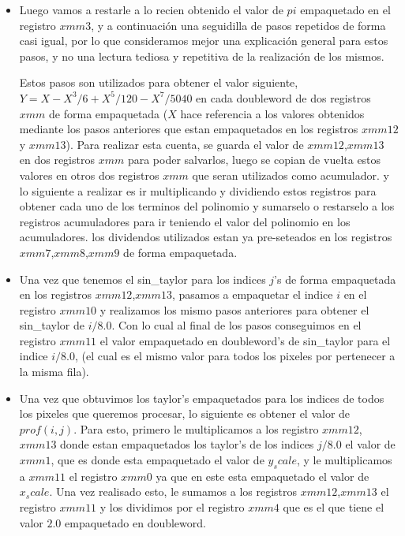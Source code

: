\begin{itemize}
	\item Luego vamos a restarle a lo recien obtenido el valor de $pi$ empaquetado en el registro $xmm3$, y a continuación una seguidilla de pasos repetidos de forma casi igual, por lo que consideramos mejor una explicación general para estos pasos, y no una lectura tediosa y repetitiva de la realización de los mismos.

	Estos pasos son utilizados para obtener el valor siguiente, $Y = X - X^3/6 + X^5/120 - X^7/5040$ en cada doubleword de dos registros $xmm$ de forma empaquetada ($X$ hace referencia a los valores obtenidos mediante los pasos anteriores que estan empaquetados en los registros $xmm12$ y $xmm13$).
	Para realizar esta cuenta, se guarda el valor de $xmm12$,$xmm13$ en dos registros $xmm$ para poder salvarlos, luego se copian de vuelta estos valores en otros dos registros $xmm$ que seran utilizados como acumulador. y lo siguiente a realizar es ir multiplicando y dividiendo estos registros para obtener cada uno de los terminos del polinomio y sumarselo o restarselo a los registros acumuladores para ir teniendo el valor del polinomio en los acumuladores. los dividendos utilizados estan ya pre-seteados en los registros $xmm7$,$xmm8$,$xmm9$ de forma empaquetada.

	\item Una vez que tenemos el sin_taylor para los indices $j$'s de forma empaquetada en los registros $xmm12$,$xmm13$, pasamos a empaquetar el indice $i$ en el registro $xmm10$ y realizamos los mismo pasos anteriores para obtener el sin_taylor de $i/8.0$. Con lo cual al final de los pasos conseguimos en el registro $xmm11$ el valor empaquetado en doubleword's de sin_taylor para el indice $i/8.0$, (el cual es el mismo valor para todos los pixeles por pertenecer a la misma fila).

	\item Una vez que obtuvimos los taylor's empaquetados para los indices de todos los pixeles que queremos procesar, lo siguiente es obtener el valor de $prof(i,j)$. Para esto, primero le multiplicamos a los registro $xmm12$,$xmm13$ donde estan empaquetados los taylor's de los indices $j/8.0$ el valor de $xmm1$, que es donde esta empaquetado el valor de $y_scale$, y le multiplicamos  a $xmm11$ el registro $xmm0$ ya que en este esta empaquetado el valor de $x_scale$. Una vez realisado esto, le sumamos a los registros $xmm12$,$xmm13$ el registro $xmm11$ y los dividimos por el registro $xmm4$ que es el que tiene el valor $2.0$ empaquetado en doubleword.


\end{itemize}
